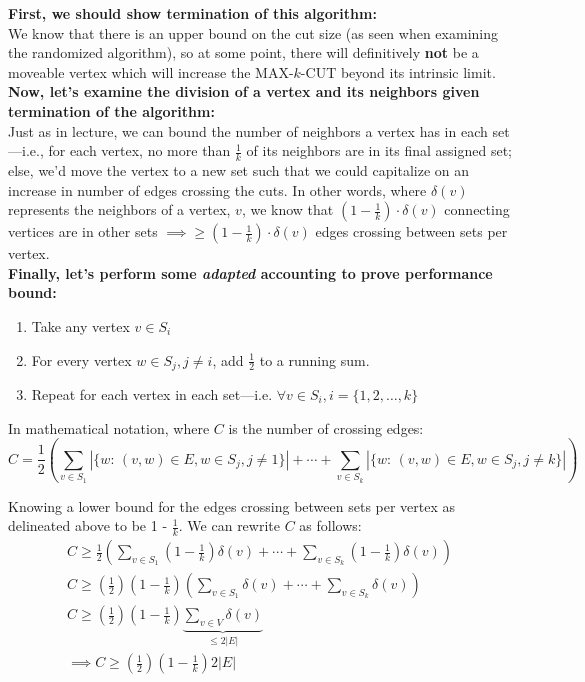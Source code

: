 \documentclass[conference]{styles/acmsiggraph}
\newcommand{\?}{\stackrel{?}{=}}
\begin{document}
\textbf{First, we should show termination of this algorithm:}\\
We know that there is an upper bound on the cut size (as seen when examining the randomized algorithm), so at some point, there will definitively \textbf{not} be a moveable vertex which will increase the MAX-$k$-CUT beyond its intrinsic limit.\\

\textbf{Now, let's examine the division of a vertex and its neighbors given termination of the algorithm:}\\
Just as in lecture, we can bound the number of neighbors a vertex has in each set---i.e., for each vertex, no more than $\frac{1}{k}$ of its neighbors are in its final assigned set; else, we'd move the vertex to a new set such that we could capitalize on an increase in number of edges crossing the cuts.  In other words, where $\delta(v)$ represents the neighbors of a vertex, $v$, we know that $\left (1 - \frac{1}{k}\right) \cdot \delta(v)$ connecting vertices are in other sets $\implies \geq \left (1 - \frac{1}{k}\right) \cdot \delta(v)$ edges crossing between sets per vertex.\\

\textbf{Finally, let's perform some \textit{adapted} accounting to prove performance bound:}
\begin{enumerate}
    \item Take any vertex $v \in S_i$
    \item For every vertex $w \in S_{j}, j \neq i$, add $\frac{1}{2}$ to a running sum.
    \item Repeat for each vertex in each set---i.e. $\forall v \in S_{i}, i = \{1,2, \ldots,k\}$
\end{enumerate}

In mathematical notation, where $C$ is the number of crossing edges:
\begin{equation}
    C = \frac{1}{2} \left(  \sum_{v \in S_1}  \left | \{w\text{: } (v,w) \in E, w \in S_{j}, j \neq 1\} \right | + \cdots +  \sum_{v \in S_k}  \left | \{w\text{: } (v,w) \in E, w \in S_{j}, j \neq k\} \right | \right)
\end{equation}

Knowing a lower bound for the edges crossing between sets per vertex as delineated above to be 1 - $\frac{1}{k}$.  We can rewrite $C$ as follows:
\begin{align}
    C \geq \frac{1}{2} \left(  \sum_{v \in S_1}  \left(1 - \frac{1}{k}\right) \delta(v) + \cdots +  \sum_{v \in S_k}  \left(1 - \frac{1}{k}\right) \delta(v) \right) \\
    C \geq \left(\frac{1}{2}\right) \left(1 - \frac{1}{k}\right)\left(  \sum_{v \in S_1}\delta(v) + \cdots +  \sum_{v \in S_k} \delta(v) \right) \\
    C \geq \left(\frac{1}{2}\right) \left(1 - \frac{1}{k}\right)\underbrace{\sum_{v \in V}\delta(v)}_{\leq 2|E|}\\
    \implies C \geq \left(\frac{1}{2}\right) \left(1 - \frac{1}{k}\right) 2|E|
\end{align}
\end{document}
